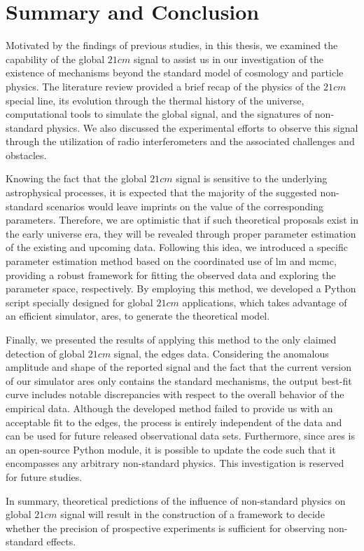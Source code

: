 \documentclass[12pt, TexShade, letterpaper]{report}
\begin{document}
\section{Summary and Conclusion}
Motivated by the findings of previous studies, in this thesis, we examined the capability of the global $21cm$ signal to assist us in our investigation of the existence of mechanisms beyond the standard model of cosmology and particle physics. The literature review provided a brief recap of the physics of the $21cm$ special line, its evolution through the thermal history of the universe, computational tools to simulate the global signal, and the signatures of non-standard physics. We also discussed the experimental efforts to observe this signal through the utilization of radio interferometers and the associated challenges and obstacles.\par
Knowing the fact that the global $21cm$ signal is sensitive to the underlying astrophysical processes, it is expected that the majority of the suggested non-standard scenarios would leave imprints on the value of the corresponding parameters. Therefore, we are optimistic that if such theoretical proposals exist in the early universe era, they will be revealed through proper parameter estimation of the existing and upcoming data. Following this idea, we introduced a specific parameter estimation method based on the coordinated use of \gls{lm} and \gls{mcmc}, providing a robust framework for fitting the observed data and exploring the parameter space, respectively. By employing this method, we developed a Python script specially designed for global $21cm$ applications, which takes advantage of an efficient simulator, \gls{ares}, to generate the theoretical model.\par
Finally, we presented the results of applying this method to the only claimed detection of global $21cm$ signal, the \gls{edges} data. Considering the anomalous amplitude and shape of the reported signal and the fact that the current version of our simulator \gls{ares} only contains the standard mechanisms, the output best-fit curve includes notable discrepancies with respect to the overall behavior of the empirical data. Although the developed method failed to provide us with an acceptable fit to the \gls{edges}, the process is entirely independent of the data and can be used for future released observational data sets. Furthermore, since \gls{ares} is an open-source Python module, it is possible to update the code such that it encompasses any arbitrary non-standard physics. This investigation is reserved for future studies.\par
In summary, theoretical predictions of the influence of non-standard physics on global $21cm$ signal will result in the construction of a framework to decide whether the precision of prospective experiments is sufficient for observing non-standard effects.\par
\end{document}
